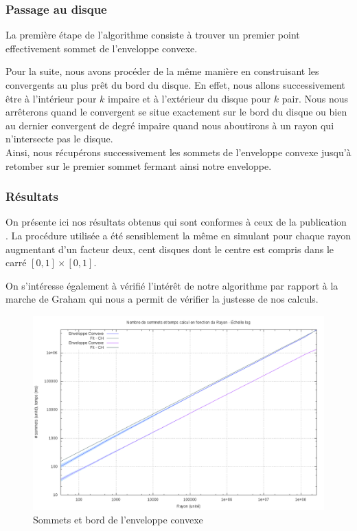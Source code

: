 \subsubsection{Passage au disque}

La première étape de l'algorithme consiste à trouver un premier point effectivement sommet de l'enveloppe convexe. 

Pour la suite, nous avons procéder de la même manière en construisant les convergents au plus prêt du bord du disque. En effet, nous allons successivement être à l'intérieur pour $k$ impaire et à l'extérieur du disque pour $k$ pair. Nous nous arrêterons quand le convergent se situe exactement sur le bord du disque ou bien au dernier convergent de degré impaire quand nous aboutirons à un rayon qui n'intersecte pas le disque.\\

Ainsi, nous récupérons successivement les sommets de l'enveloppe convexe jusqu'à retomber sur le premier sommet fermant ainsi notre enveloppe.


\subsubsection{Résultats}


On présente ici nos résultats obtenus qui sont conformes à ceux de la publication \cite{HarPeled98}. La procédure utilisée a été sensiblement la même en simulant pour chaque rayon augmentant d'un facteur deux, cent disques dont le centre est compris dans le carré $[0,1]\times[0,1]$.

On s'intéresse également à vérifié l'intérêt de notre algorithme par rapport à la marche de Graham qui nous a permit de vérifier la justesse de nos calculs. 

\begin{figure}[h!]
  \centering
  \includegraphics[width=0.8\linewidth]{fig/4-exi/ch/exi-ch-sommet.png}
  \caption{Sommets et bord de l'enveloppe convexe}
\end{figure}

